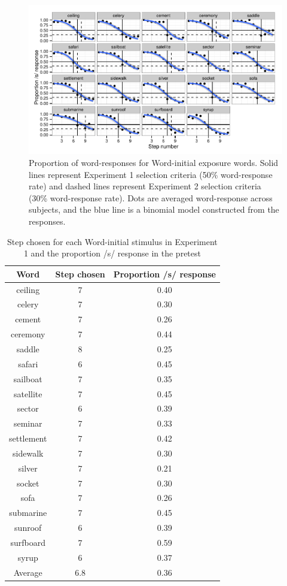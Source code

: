 \begin{figure}
\includegraphics[width=\textwidth]{graphs/sinitialpretest.pdf}
\caption{Proportion of word-responses for Word-initial exposure words. Solid lines represent Experiment 1 selection criteria (50\% word-response rate) and dashed lines represent Experiment 2 selection criteria (30\% word-response rate).  Dots are averaged word-response across subjects, and the blue line is a binomial model constructed from the responses.}
\end{figure}

\begin{table}
\caption{Step chosen for each Word-initial stimulus in Experiment 1 and the proportion /s/ response in the pretest}
\label{tbl:exp1srespinitial}
\centering
\begin{tabular}{ccc}
\toprule
Word & Step chosen & Proportion /s/ response \\
\midrule
 ceiling & 7 & 0.40 \\
celery & 7 & 0.30 \\
cement & 7 & 0.26 \\
ceremony & 7 & 0.44 \\
saddle & 8 & 0.25 \\
safari & 6 & 0.45 \\
sailboat & 7 & 0.35 \\
satellite & 7 & 0.45 \\
sector & 6 & 0.39 \\
 seminar & 7 & 0.33 \\
 settlement & 7 & 0.42 \\
 sidewalk & 7 & 0.30 \\
 silver & 7 & 0.21 \\
 socket & 7 & 0.30 \\
 sofa & 7 & 0.26 \\
 submarine & 7 & 0.45 \\
 sunroof & 6 & 0.39 \\
 surfboard & 7 & 0.59 \\
 syrup & 6 & 0.37 \\
\midrule
 Average &  6.8 & 0.36 \\

\bottomrule
\end{tabular}
\end{table}

